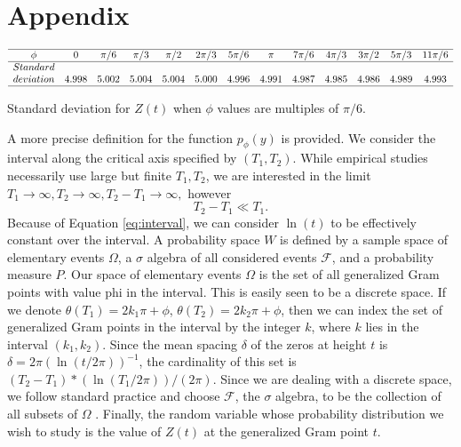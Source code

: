 \documentclass[twoside]{article}
\begin{document}
\section*{\label{appendix} Appendix}

\begin{table}
\centering \(\begin{array}{ccccccccccccc}
\hline
\phi & 0& \pi/6 &  \pi/3 &  \pi/2 & 2 \pi/3 & 5\pi/6 & \pi & 7\pi/6 & 4\pi/3 & 3\pi/2 & 5\pi/3 & 11\pi/6 \\
\hline
Standard& \\
deviation & 4.998& 5.002& 5.004& 5.004& 5.000& 4.996& 4.991& 4.987& 4.985& 4.986& 4.989& 4.993\\
\hline
\end{array}\)
\caption{Standard deviation for  $Z(t)$ when $\phi$ values are multiples of $\pi/6$.}
\label{tab:stddev6}
\end{table}

A more precise definition for the function $p_{\phi}(y)$ is provided. We consider the interval along the critical axis specified by $(T_1, T_2)$. While empirical studies necessarily use large but finite  $T_1, T_2$, we are interested in the limit 
$T_1 \rightarrow \infty, T_2 \rightarrow \infty,  T_2-T_1 \rightarrow \infty,$ however
\begin{equation}
T_2 - T_1  \ll T_1. 
\label{eq:interval}
\end{equation}
Because of Equation \ref{eq:interval}, we can consider  $\ln (t)$  to be effectively constant over  the interval. A probability space $W$ is defined by a sample space of elementary events $\Omega$, a $\sigma$ algebra of all considered events $\mathcal{F}$, and a probability measure $P$. Our space of elementary events $\Omega$ is the set of all generalized Gram points with value phi in the interval. This is easily seen to be a discrete space. If we denote $\theta (T_1) = 2k_1\pi + \phi$, $\theta (T_2) = 2k_2\pi + \phi$, then we can index the set of generalized Gram points in the interval by the integer  $k$, where $k$ lies in the interval $(k_1, k_2)$. Since the mean spacing $\delta$ of the zeros at height $t$ is $\delta = 2\pi(\ln (t/2\pi))^{-1}$, the cardinality of this set is $(T_2 - T_1)*(\ln (T_1/2\pi))/(2\pi)$. Since we are dealing with a discrete space, we follow standard practice and choose $\mathcal{F}$,  the  $\sigma$ algebra, to be the collection of all subsets of $\Omega$ . Finally, the random variable whose probability distribution we wish to study is the value of $Z(t)$ at the generalized Gram point $t$.
\end{document}
